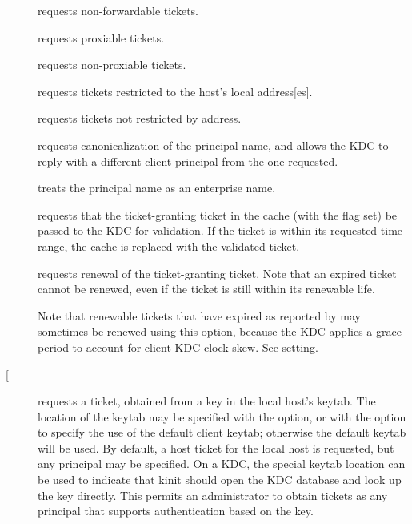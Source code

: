 \documentclass[letterpaper,10pt,english]{sphinxmanual}
\begin{document}
\begin{description}
\item[{}] \leavevmode
requests non-forwardable tickets.

\item[{}] \leavevmode
requests proxiable tickets.

\item[{}] \leavevmode
requests non-proxiable tickets.

\item[{}] \leavevmode
requests tickets restricted to the host’s local address{[}es{]}.

\item[{}] \leavevmode
requests tickets not restricted by address.

\item[{}] \leavevmode
requests canonicalization of the principal name, and allows the
KDC to reply with a different client principal from the one
requested.

\item[{}] \leavevmode
treats the principal name as an enterprise name.

\item[{}] \leavevmode
requests that the ticket-granting ticket in the cache (with the
 flag set) be passed to the KDC for validation.  If the
ticket is within its requested time range, the cache is replaced
with the validated ticket.

\item[{}] \leavevmode
requests renewal of the ticket-granting ticket.  Note that an
expired ticket cannot be renewed, even if the ticket is still
within its renewable life.

Note that renewable tickets that have expired as reported by
{\hyperref[\detokenize{user/user_commands/klist:klist-1}]{}} may sometimes be renewed using this option,
because the KDC applies a grace period to account for client-KDC
clock skew.  See   setting.

\item[{ {[} \textbar{}  \sphinxstyleemphasis{keytab\_file}{]}}] \leavevmode
requests a ticket, obtained from a key in the local host’s keytab.
The location of the keytab may be specified with the 
 option, or with the  option to specify the use
of the default client keytab; otherwise the default keytab will be
used.  By default, a host ticket for the local host is requested,
but any principal may be specified.  On a KDC, the special keytab
location  can be used to indicate that kinit should open
the KDC database and look up the key directly.  This permits an
administrator to obtain tickets as any principal that supports
authentication based on the key.


\end{description}
\end{document}
